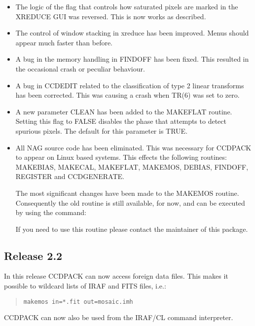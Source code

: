 \documentclass[twoside,11pt]{article}
\newcommand{\htmlref}[2]{#1}
\renewcommand{\_}{\texttt{\symbol{95}}}
\newcommand{\xroutine}[1]{\htmlref{{\sc #1}}{#1}}
\begin{document}
 \begin{itemize}
  \item The logic of the flag that controls how saturated pixels are
   marked in the \xroutine{XREDUCE} GUI was reversed. This is now works as
   described.

  \item The control of window stacking in xreduce has been improved.
   Menus should appear much faster than before.

  \item A bug in the memory handling in \xroutine{FINDOFF} has been fixed. This
   resulted in the occasional crash or peculiar behaviour.


   \item A bug in \xroutine{CCDEDIT} related to the classification of type 2 linear
   transforms has been corrected. This was causing a crash when
   TR(6) was set to zero.

   \item A new parameter CLEAN has been added to the \xroutine{MAKEFLAT} routine.
   Setting this flag to FALSE disables the phase that attempts to
   detect spurious pixels. The default for this parameter is TRUE.

   \item All NAG source code has been eliminated. This was necessary
   for CCDPACK to appear on Linux based systems. This effects the
   following routines:
      \xroutine{MAKEBIAS}, \xroutine{MAKECAL}, \xroutine{MAKEFLAT},
      \xroutine{MAKEMOS}, \xroutine{DEBIAS}, \xroutine{FINDOFF},
      \xroutine{REGISTER} and CCDGENERATE.

   The most significant changes have been made to the MAKEMOS routine.
   Consequently the old routine is still available, for now, and can be
   executed by using the command:
   If you need to use this routine please contact the maintainer of
   this package.
\end{itemize}

\subsection{Release 2.2}
In this release CCDPACK can now access foreign data files. This
makes it possible to wildcard lists of IRAF and FITS files, i.e.:
\begin{quote}
\begin{verbatim}
makemos in=*.fit out=mosaic.imh
\end{verbatim}
\end{quote}
CCDPACK can now also be used from the IRAF/CL command interpreter.
\end{document}

